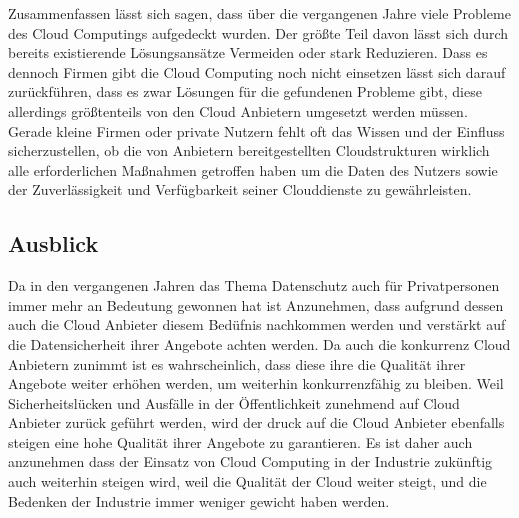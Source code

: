 Zusammenfassen lässt sich sagen, dass über die vergangenen Jahre viele Probleme des Cloud Computings aufgedeckt wurden. Der größte Teil davon lässt sich durch bereits existierende Lösungsansätze Vermeiden oder stark Reduzieren. Dass es dennoch Firmen gibt die Cloud Computing noch nicht einsetzen lässt sich darauf zurückführen, dass es zwar Lösungen für die gefundenen Probleme gibt, diese allerdings größtenteils von den Cloud Anbietern umgesetzt werden müssen. Gerade kleine Firmen oder private Nutzern fehlt oft das Wissen und der Einfluss sicherzustellen, ob die von Anbietern bereitgestellten Cloudstrukturen wirklich alle erforderlichen Maßnahmen getroffen haben um die Daten des Nutzers sowie der Zuverlässigkeit und Verfügbarkeit seiner Clouddienste zu gewährleisten.

\subsection{Ausblick}
Da in den vergangenen Jahren das Thema Datenschutz auch für Privatpersonen immer mehr an Bedeutung gewonnen hat ist Anzunehmen, dass aufgrund dessen auch die Cloud Anbieter diesem Bedüfnis nachkommen werden und verstärkt auf die Datensicherheit ihrer Angebote achten werden. 
Da auch die konkurrenz Cloud Anbietern zunimmt ist es wahrscheinlich, dass diese ihre die Qualität ihrer Angebote weiter erhöhen werden, um weiterhin konkurrenzfähig zu bleiben.
Weil Sicherheitslücken und Ausfälle in der Öffentlichkeit zunehmend auf Cloud Anbieter zurück geführt werden, wird der druck auf die Cloud Anbieter ebenfalls steigen eine hohe Qualität ihrer Angebote zu garantieren.
Es ist daher auch anzunehmen dass der Einsatz von Cloud Computing in der Industrie zukünftig auch weiterhin steigen wird, weil die Qualität der Cloud weiter steigt, und die Bedenken der Industrie immer weniger gewicht haben werden.

